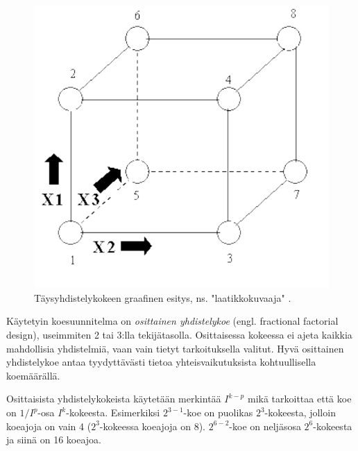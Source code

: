 \documentclass[12pt,a4paper,finnish]{tutthesis}
\begin{document}
\begin{figure}[h]
  \begin{center}
    \includegraphics[scale=0.6]{cube}
  \end{center}
  \caption[Laatikkokuvaaja]{Täysyhdistelykokeen graafinen esitys, ns. "laatikkokuvaaja" \parencite{ehandbook}.}
  \label{fig:cube}
\end{figure}






Käytetyin koesuunnitelma on \textit{osittainen yhdistelykoe} (engl. fractional factorial
design), useimmiten 2 tai 3:lla tekijätasolla. Osittaisessa kokeessa ei ajeta
kaikkia mahdollisia yhdistelmiä, vaan vain tietyt tarkoituksella valitut. Hyvä
osittainen yhdistelykoe antaa tyydyttävästi tietoa yhteisvaikutuksista
kohtuullisella koemäärällä.

Osittaisista yhdistelykokeista käytetään merkintää \(I^{k - p}\)
mikä tarkoittaa että koe on \(1/I^p\)-osa \(I^k\)-kokeesta.
Esimerkiksi \(2^{3 - 1}\)-koe on puolikas \(2^3\)-kokeesta,
jolloin koeajoja on vain 4 (\(2^3\)-kokeessa koeajoja on 8).
\(2^{6-2}\)-koe on neljäsosa \(2^6\)-kokeesta
ja siinä on 16 koeajoa.
\end{document}
